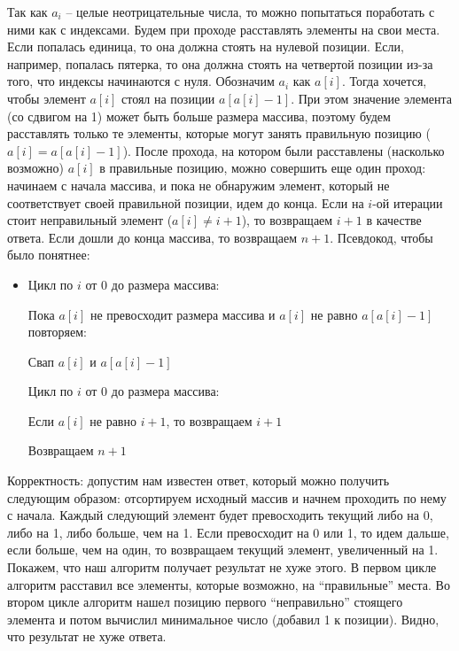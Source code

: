 \begin{enumerate}
    \begin{solution}
      Так как $a_i$ -- целые неотрицательные числа, то можно попытаться поработать с ними как с индексами. Будем при проходе расставлять элементы на свои места. Если попалась единица, то она должна стоять на нулевой позиции. Если, например, попалась пятерка, то она должна стоять на четвертой позиции из-за того, что индексы начинаются с нуля. Обозначим $a_i$ как $a[i]$. Тогда хочется, чтобы элемент $a[i]$ стоял на позиции $a[a[i]-1]$. При этом значение элемента (со сдвигом на 1) может быть больше размера массива, поэтому будем расставлять только те элементы, которые могут занять правильную позицию ($a[i] = a[a[i]-1]$). После прохода, на котором были расставлены (насколько возможно) $a[i]$ в правильные позицию, можно совершить еще один проход: начинаем с начала массива, и пока не обнаружим элемент, который не соответствует своей правильной позиции, идем до конца. Если на $i$-ой итерации стоит неправильный элемент ($a[i] \neq i + 1$), то возвращаем $i + 1$ в качестве ответа. Если дошли до конца массива, то возвращаем $n + 1$. Псевдокод, чтобы было понятнее:
      \begin{itemize}
        \item Цикл по $i$ от 0 до размера массива:
        
        \hspace{10mm} Пока $a[i]$ не превосходит размера массива и $a[i]$ не равно $a[a[i]-1]$ повторяем:

        \hspace{20mm} Свап $a[i]$ и $a[a[i]-1]$

        Цикл по $i$ от 0 до размера массива:

        \hspace{10mm} Если $a[i]$ не равно $i + 1$, то возвращаем $i + 1$

        Возвращаем $n + 1$
      \end{itemize}

      Корректность: допустим нам известен ответ, который можно получить следующим образом: отсортируем исходный массив и начнем проходить по нему с начала. Каждый следующий элемент будет превосходить текущий либо на 0, либо на 1, либо больше, чем на 1. Если превосходит на 0 или 1, то идем дальше, если больше, чем на один, то возвращаем текущий элемент, увеличенный на 1. Покажем, что наш алгоритм получает результат не хуже этого. В первом цикле алгоритм расставил все элементы, которые возможно, на ``правильные'' места. Во втором цикле алгоритм нашел позицию первого ``неправильно'' стоящего элемента и потом вычислил минимальное число (добавил 1 к позиции). Видно, что результат не хуже ответа.


\end{solution}
\end{enumerate}
